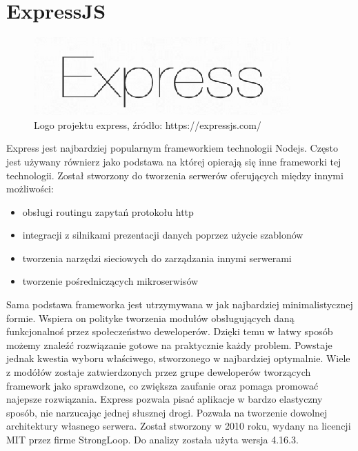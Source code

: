 \documentclass[12pt]{report}
\begin{document}
  \section{ExpressJS}
    \begin{figure}[!hb]
      \centering
      \includegraphics[width=\textwidth,height=\textheight,keepaspectratio]{logo_express.png} 
      \caption{Logo projektu express, źródło: https://expressjs.com/}
    \end{figure}
    Express jest najbardziej popularnym frameworkiem technologii Nodejs.
    Często jest używany równierz jako podstawa na której opierają się inne frameworki tej technologii.
    Został stworzony do tworzenia serwerów oferujących między innymi możliwości:
    \begin{itemize}
      \item obsługi routingu zapytań protokołu http
      \item integracji z silnikami prezentacji danych poprzez użycie szablonów
      \item tworzenia narzędzi sieciowych do zarządzania innymi serwerami
      \item tworzenie pośredniczących mikroserwisów
    \end{itemize} 
    Sama podstawa frameworka jest utrzymywana w jak najbardziej minimalistycznej formie.
    Wspiera on polityke tworzenia modułów obsługujących daną funkcjonalnoś przez społeczeństwo deweloperów.
    Dzięki temu w łatwy sposób możemy znaleźć rozwiązanie gotowe na praktycznie każdy problem.
    Powstaje jednak kwestia wyboru właściwego, stworzonego w najbardziej optymalnie.
    Wiele z modółów zostaje zatwierdzonych przez grupe deweloperów tworzących framework jako sprawdzone, co zwiększa zaufanie oraz pomaga promować najepsze rozwiązania.
    Express pozwala pisać aplikacje w bardzo elastyczny sposób, nie narzucając jednej słusznej drogi.
    Pozwala na tworzenie dowolnej architektury własnego serwera.
    Został stworzony w 2010 roku, wydany na licencji MIT przez firme StrongLoop.
    Do analizy została użyta wersja 4.16.3.
\end{document}
